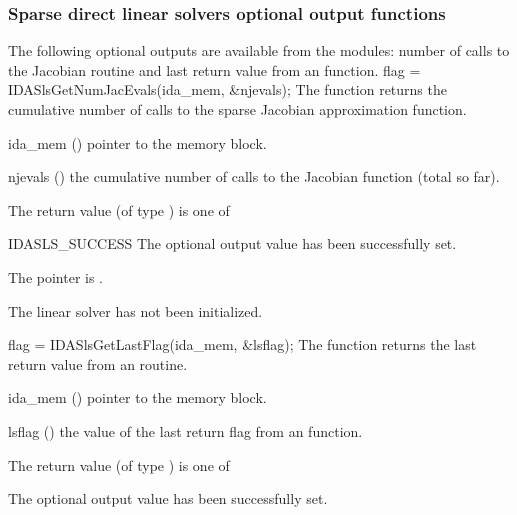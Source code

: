 {\subsubsection{Sparse direct linear solvers optional output functions}\label{sss:optout_sls}
The following optional outputs are available from the {\idasls} modules:
number of calls to the Jacobian routine and last return value from an
{\idasls} function.
{
  flag = IDASlsGetNumJacEvals(ida\_mem, \&njevals);
}
{
  The function  returns the
  cumulative number of calls to the {\idasls} sparse
  Jacobian approximation function.
}
{
  \begin{args}[njevals]
  \item[ida\_mem] ()
    pointer to the {\ida} memory block.
  \item[njevals] ()
    the cumulative number of calls to the Jacobian function (total so far).
  \end{args}
}
{
  The return value  (of type ) is one of
  \begin{args}
  \item[IDASLS\_SUCCESS] 
    The optional output value has been successfully set.
  \item[\Id{IDASLS\_MEM\_NULL}]
    The  pointer is .
  \item[\Id{IDASLS\_LMEM\_NULL}]
    The {\idasls} linear solver has not been initialized.
  \end{args}
}
{}
{
  flag = IDASlsGetLastFlag(ida\_mem, \&lsflag);
}
{
  The function  returns the
  last return value from an {\idasls} routine. 
}
{
  \begin{args}
  \item[ida\_mem] ()
    pointer to the {\ida} memory block.
  \item[lsflag] ()
    the value of the last return flag from an {\idasls} function.
  \end{args}
}
{
  The return value  (of type ) is one of
  \begin{args}
  \item[\Id{IDASLS\_SUCCESS}] 
    The optional output value has been successfully set.

\end{args}}}
